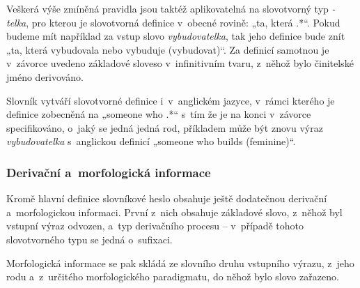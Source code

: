 Veškerá výše zmíněná pravidla jsou taktéž aplikovatelná na slovotvorný
typ \emph{-telka}, pro kterou je slovotvorná definice v~obecné rovině:
„ta, která .*``. Pokud budeme mít například za vstup slovo
\emph{vybudovatelka}, tak jeho definice bude znít „ta, která vybudovala
nebo vybuduje (vybudovat)``. Za definicí samotnou je v~závorce uvedeno
základové sloveso v~infinitivním tvaru, z~něhož bylo činitelské jméno
derivováno.

Slovník vytváří slovotvorné definice i~v~anglickém jazyce, v~rámci
kterého je definice zobecněná na „someone who .*`` s~tím že je na konci
v~závorce specifikováno, o~jaký se jedná jedná rod, příkladem může být
znovu výraz \emph{vybudovatelka} s~anglickou definicí „someone who
builds (feminine)``.

\hypertarget{derivaux10dnuxed-a-morfologickuxe1-informace}{%
\subsubsection{Derivační a~morfologická
informace}\label{derivaux10dnuxed-a-morfologickuxe1-informace}}

Kromě hlavní definice slovníkové heslo obsahuje ještě dodatečnou
derivační a~morfologickou informaci. První z~nich obsahuje základové
slovo, z~něhož byl vstupní výraz odvozen, a~typ derivačního procesu --
v~případě tohoto slovotvorného typu se jedná o~sufixaci.

Morfologická informace se pak skládá ze slovního druhu vstupního výrazu,
z~jeho rodu a~z~určitého morfologického paradigmatu, do něhož bylo slovo
zařazeno.
